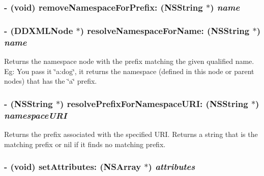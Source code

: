 \label{class_d_d_x_m_l_element_aa6bc2079078c24d43cc95937ac3c04bd}
\hypertarget{class_d_d_x_m_l_element_ae129e509356327ebe9b2bfa178114feb}{
\subsubsection[{removeNamespaceForPrefix:}]{\setlength{\rightskip}{0pt plus 5cm}-\/ (void) removeNamespaceForPrefix: ({\bf NSString} $\ast$) {\em name}}}
\label{class_d_d_x_m_l_element_ae129e509356327ebe9b2bfa178114feb}
\hypertarget{class_d_d_x_m_l_element_afd0fe95a6e828501ee207a5c692bc1e3}{
\subsubsection[{resolveNamespaceForName:}]{\setlength{\rightskip}{0pt plus 5cm}-\/ ({\bf DDXMLNode} $\ast$) resolveNamespaceForName: ({\bf NSString} $\ast$) {\em name}}}
\label{class_d_d_x_m_l_element_afd0fe95a6e828501ee207a5c692bc1e3}
Returns the namespace node with the prefix matching the given qualified name. Eg: You pass it \char`\"{}a:dog\char`\"{}, it returns the namespace (defined in this node or parent nodes) that has the \char`\"{}a\char`\"{} prefix. \hypertarget{class_d_d_x_m_l_element_a2b4fa5b03afb01b8c379ffb711614019}{
\subsubsection[{resolvePrefixForNamespaceURI:}]{\setlength{\rightskip}{0pt plus 5cm}-\/ ({\bf NSString} $\ast$) resolvePrefixForNamespaceURI: ({\bf NSString} $\ast$) {\em namespaceURI}}}
\label{class_d_d_x_m_l_element_a2b4fa5b03afb01b8c379ffb711614019}
Returns the prefix associated with the specified URI. Returns a string that is the matching prefix or nil if it finds no matching prefix. \hypertarget{class_d_d_x_m_l_element_ab3c20c2f6b0dfa3f73183b53c0a325ed}{
\subsubsection[{setAttributes:}]{\setlength{\rightskip}{0pt plus 5cm}-\/ (void) setAttributes: (NSArray $\ast$) {\em attributes}}}

